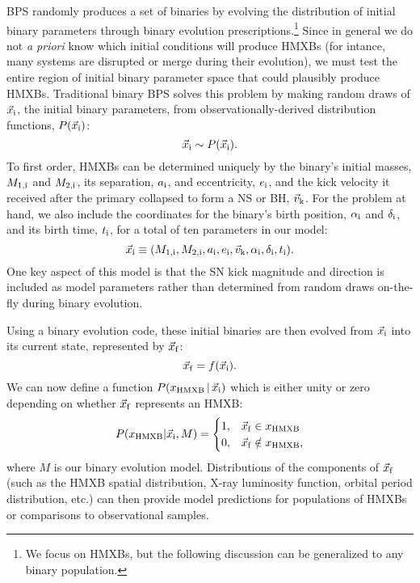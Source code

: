 \documentclass[usenatbib]{mnras}
\newcommand{\given}{\,|\,}
\begin{document}
BPS randomly produces a set of binaries by evolving the distribution of initial binary parameters through binary evolution prescriptions.\footnote{We focus on HMXBs, but the following discussion can be generalized to any binary population.} Since in general we do not {\it a priori} know which initial conditions will produce HMXBs (for intance, many systems are disrupted or merge during their evolution), we must test the entire region of initial binary parameter space that could plausibly produce HMXBs. Traditional binary BPS solves this problem by making random draws of $\vec{x}_{\rm i}$, the initial binary parameters, from observationally-derived distribution functions, $P(\vec{x}_{\rm i})$:
\begin{equation}
\vec{x}_{\rm i} \sim P(\vec{x}_{\rm i}).
\end{equation}
To first order, HMXBs can be determined uniquely by the binary's initial masses, $M_{\rm 1,i}$ and $M_{\rm 2,i}$, its separation, $a_{\rm i}$, and eccentricity, $e_{\rm i}$, and the kick velocity it received after the primary collapsed to form a NS or BH, $\vec{v}_{\rm k}$. For the problem at hand, we also include the coordinates for the binary's birth position, $\alpha_{\rm i}$ and $\delta_{\rm i}$, and its birth time, $t_{\rm i}$, for a total of ten parameters in our model:
\begin{equation}
\vec{x}_{\rm i} \equiv ( M_{\rm 1,i}, M_{\rm 2,i}, a_{\rm i}, e_{\rm i}, \vec{v}_{\rm k}, \alpha_{\rm i}, \delta_{\rm i}, t_{\rm i} ). \label{eq:x_i}
\end{equation}
One key aspect of this model is that the SN kick magnitude and direction is included as model parameters rather than determined from random draws on-the-fly during binary evolution.



Using a binary evolution code, these initial binaries are then evolved from $\vec{x}_{\rm i}$ into its current state, represented by $\vec{x}_{\rm f}$:
\begin{equation}
\vec{x}_{\rm f} = f(\vec{x}_{\rm i}). \label{eq:xf_xi}
\end{equation}
We can now define a function $P(x_{\rm HMXB} \given \vec{x}_{\rm i})$ which is either unity or zero depending on whether $\vec{x}_{\rm f}$ represents an HMXB:
\begin{equation}
P(x_{\rm HMXB} | \vec{x}_{\rm i}, M) = 
\begin{cases}
1, & \vec{x}_{\rm f} \in x_{\rm HMXB} \\
0, & \vec{x}_{\rm f} \notin x_{\rm HMXB},
\end{cases}
\end{equation}
where $M$ is our binary evolution model. Distributions of the components of $\vec{x}_{\rm f}$ (such as the HMXB spatial distribution, X-ray luminosity function, orbital period distribution, etc.) can then provide model predictions for populations of HMXBs or comparisons to observational samples.
\end{document}
